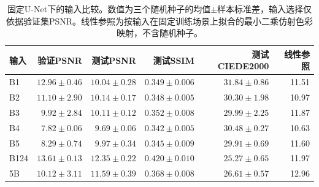 \begin{table}[htbp]
\centering
\caption{固定U-Net下的输入比较。数值为三个随机种子的均值$\pm$样本标准差，输入选择仅依据验证集PSNR。线性参照为按输入在固定训练场景上拟合的最小二乘仿射色彩映射，不含随机种子。}
\label{tab:input-results-zh}
\small
\begin{tabular}{lrrrrr}
\toprule
输入 & 验证PSNR & 测试PSNR & 测试SSIM & 测试CIEDE2000 & 线性参照 \\
\midrule
B1 & $12.96\pm0.46$ & $10.04\pm0.28$ & $0.349\pm0.006$ & $31.84\pm0.86$ & 11.51 \\
B2 & $11.10\pm2.90$ & $10.14\pm0.17$ & $0.348\pm0.005$ & $30.30\pm1.98$ & 10.97 \\
B3 & $9.92\pm2.84$ & $10.11\pm0.12$ & $0.352\pm0.008$ & $29.99\pm2.25$ & 11.87 \\
B4 & $7.82\pm0.06$ & $9.69\pm0.06$ & $0.342\pm0.005$ & $30.48\pm0.27$ & 10.63 \\
B5 & $8.29\pm0.74$ & $9.97\pm0.34$ & $0.345\pm0.009$ & $29.91\pm0.69$ & 11.60 \\
B124 & $13.61\pm0.13$ & $12.35\pm0.22$ & $0.420\pm0.010$ & $25.27\pm0.65$ & 11.97 \\
5B & $10.12\pm3.11$ & $11.59\pm0.39$ & $0.368\pm0.008$ & $26.61\pm0.57$ & 12.96 \\
\bottomrule
\end{tabular}
\end{table}
